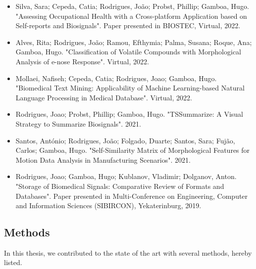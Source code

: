 \begin{itemize}

\item Silva, Sara; Cepeda, Catia; Rodrigues, João; Probst, Phillip; Gamboa, Hugo. "Assessing Occupational Health with a Cross-platform Application based on Self-reports and Biosignals". Paper presented in BIOSTEC, Virtual, 2022.

\item Alves, Rita; Rodrigues, João; Ramou, Efthymia; Palma, Susana; Roque, Ana; Gamboa, Hugo. "Classification of Volatile Compounds with Morphological Analysis of e-nose Response". Virtual, 2022.

\item Mollaei, Nafiseh; Cepeda, Catia; Rodrigues, Joao; Gamboa, Hugo. "Biomedical Text Mining: Applicability of Machine Learning-based Natural Language Processing in Medical Database". Virtual, 2022.

\item Rodrigues, Joao; Probst, Phillip; Gamboa, Hugo. "TSSummarize: A Visual Strategy to Summarize Biosignals". 2021.

\item Santos, António; Rodrigues, João; Folgado, Duarte; Santos, Sara; Fujão, Carlos; Gamboa, Hugo. "Self-Similarity Matrix of Morphological Features for Motion Data Analysis in Manufacturing Scenarios". 2021.

\item Rodrigues, Joao; Gamboa, Hugo; Kublanov, Vladimir; Dolganov, Anton. "Storage of Biomedical Signals: Comparative Review of Formats and Databases". Paper presented in Multi-Conference on Engineering, Computer and Information Sciences (SIBIRCON), Yekaterinburg, 2019.

\end{itemize}

\subsection{Methods}

In this thesis, we contributed to the state of the art with several methods, hereby listed.

